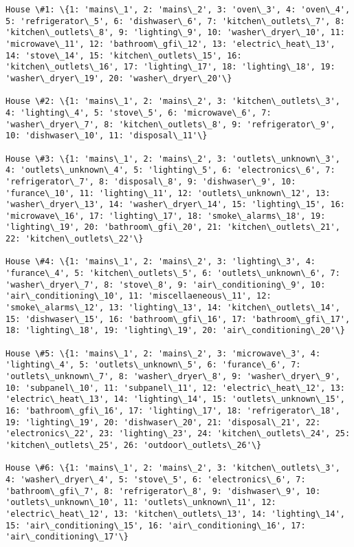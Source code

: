 \documentclass[11pt]{article}
\begin{document}
    \begin{Verbatim}[commandchars=\\\{\}]
House \#1: \{1: 'mains\_1', 2: 'mains\_2', 3: 'oven\_3', 4: 'oven\_4', 5: 'refrigerator\_5', 6: 'dishwaser\_6', 7: 'kitchen\_outlets\_7', 8: 'kitchen\_outlets\_8', 9: 'lighting\_9', 10: 'washer\_dryer\_10', 11: 'microwave\_11', 12: 'bathroom\_gfi\_12', 13: 'electric\_heat\_13', 14: 'stove\_14', 15: 'kitchen\_outlets\_15', 16: 'kitchen\_outlets\_16', 17: 'lighting\_17', 18: 'lighting\_18', 19: 'washer\_dryer\_19', 20: 'washer\_dryer\_20'\} 

House \#2: \{1: 'mains\_1', 2: 'mains\_2', 3: 'kitchen\_outlets\_3', 4: 'lighting\_4', 5: 'stove\_5', 6: 'microwave\_6', 7: 'washer\_dryer\_7', 8: 'kitchen\_outlets\_8', 9: 'refrigerator\_9', 10: 'dishwaser\_10', 11: 'disposal\_11'\} 

House \#3: \{1: 'mains\_1', 2: 'mains\_2', 3: 'outlets\_unknown\_3', 4: 'outlets\_unknown\_4', 5: 'lighting\_5', 6: 'electronics\_6', 7: 'refrigerator\_7', 8: 'disposal\_8', 9: 'dishwaser\_9', 10: 'furance\_10', 11: 'lighting\_11', 12: 'outlets\_unknown\_12', 13: 'washer\_dryer\_13', 14: 'washer\_dryer\_14', 15: 'lighting\_15', 16: 'microwave\_16', 17: 'lighting\_17', 18: 'smoke\_alarms\_18', 19: 'lighting\_19', 20: 'bathroom\_gfi\_20', 21: 'kitchen\_outlets\_21', 22: 'kitchen\_outlets\_22'\} 

House \#4: \{1: 'mains\_1', 2: 'mains\_2', 3: 'lighting\_3', 4: 'furance\_4', 5: 'kitchen\_outlets\_5', 6: 'outlets\_unknown\_6', 7: 'washer\_dryer\_7', 8: 'stove\_8', 9: 'air\_conditioning\_9', 10: 'air\_conditioning\_10', 11: 'miscellaeneous\_11', 12: 'smoke\_alarms\_12', 13: 'lighting\_13', 14: 'kitchen\_outlets\_14', 15: 'dishwaser\_15', 16: 'bathroom\_gfi\_16', 17: 'bathroom\_gfi\_17', 18: 'lighting\_18', 19: 'lighting\_19', 20: 'air\_conditioning\_20'\} 

House \#5: \{1: 'mains\_1', 2: 'mains\_2', 3: 'microwave\_3', 4: 'lighting\_4', 5: 'outlets\_unknown\_5', 6: 'furance\_6', 7: 'outlets\_unknown\_7', 8: 'washer\_dryer\_8', 9: 'washer\_dryer\_9', 10: 'subpanel\_10', 11: 'subpanel\_11', 12: 'electric\_heat\_12', 13: 'electric\_heat\_13', 14: 'lighting\_14', 15: 'outlets\_unknown\_15', 16: 'bathroom\_gfi\_16', 17: 'lighting\_17', 18: 'refrigerator\_18', 19: 'lighting\_19', 20: 'dishwaser\_20', 21: 'disposal\_21', 22: 'electronics\_22', 23: 'lighting\_23', 24: 'kitchen\_outlets\_24', 25: 'kitchen\_outlets\_25', 26: 'outdoor\_outlets\_26'\} 

House \#6: \{1: 'mains\_1', 2: 'mains\_2', 3: 'kitchen\_outlets\_3', 4: 'washer\_dryer\_4', 5: 'stove\_5', 6: 'electronics\_6', 7: 'bathroom\_gfi\_7', 8: 'refrigerator\_8', 9: 'dishwaser\_9', 10: 'outlets\_unknown\_10', 11: 'outlets\_unknown\_11', 12: 'electric\_heat\_12', 13: 'kitchen\_outlets\_13', 14: 'lighting\_14', 15: 'air\_conditioning\_15', 16: 'air\_conditioning\_16', 17: 'air\_conditioning\_17'\} 


    \end{Verbatim}
\end{document}
